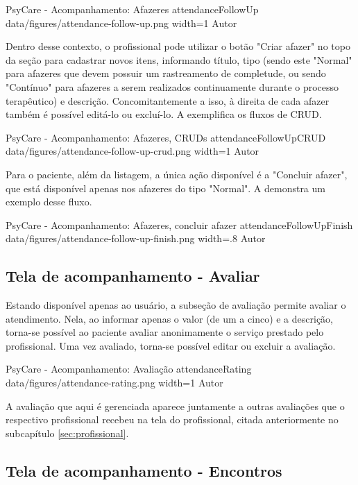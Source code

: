 \image
    {PsyCare - Acompanhamento: Afazeres}
    {attendanceFollowUp}
    {data/figures/attendance-follow-up.png}
    {width=1\textwidth}
    {Autor}

Dentro desse contexto, o profissional pode utilizar o botão "Criar afazer" no topo da seção para cadastrar novos itens, informando título, tipo (sendo este "Normal" para afazeres que devem possuir um rastreamento de completude, ou sendo "Contínuo" para afazeres a serem realizados continuamente durante o processo terapêutico) e descrição. Concomitantemente a isso, à direita de cada afazer também é possível editá-lo ou excluí-lo. A  exemplifica os fluxos de CRUD.

\image
    {PsyCare - Acompanhamento: Afazeres, CRUDs}
    {attendanceFollowUpCRUD}
    {data/figures/attendance-follow-up-crud.png}
    {width=1\textwidth}
    {Autor}

Para o paciente, além da listagem, a única ação disponível é a "Concluir afazer", que está disponível apenas nos afazeres do tipo "Normal". A  demonstra um exemplo desse fluxo.

\image
    {PsyCare - Acompanhamento: Afazeres, concluir afazer}
    {attendanceFollowUpFinish}
    {data/figures/attendance-follow-up-finish.png}
    {width=.8\textwidth}
    {Autor}

\subsection{Tela de acompanhamento - Avaliar}
\label{sec:acompanhamentoAvaliar}

Estando disponível apenas ao usuário, a subseção de avaliação permite avaliar o atendimento. Nela, ao informar apenas o valor (de um a cinco) e a descrição, torna-se possível ao paciente avaliar anonimamente o serviço prestado pelo profissional. Uma vez avaliado, torna-se possível editar ou excluir a avaliação.

\image
    {PsyCare - Acompanhamento: Avaliação}
    {attendanceRating}
    {data/figures/attendance-rating.png}
    {width=1\textwidth}
    {Autor}

A avaliação que aqui é gerenciada aparece juntamente a outras avaliações que o respectivo profissional recebeu na tela do profissional, citada anteriormente no subcapítulo \ref{sec:profissional}.

\subsection{Tela de acompanhamento - Encontros}
\label{sec:acompanhamentoEncontros}

